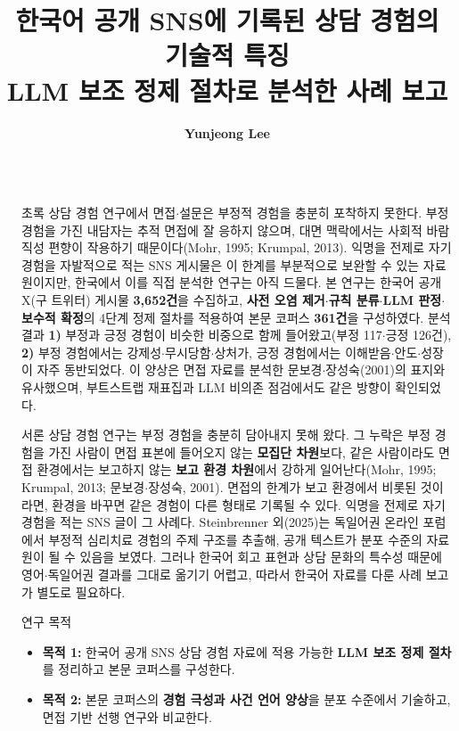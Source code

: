 \documentclass[final]{beamer}
\title{한국어 공개 SNS에 기록된 상담 경험의 기술적 특징\\
\large LLM 보조 정제 절차로 분석한 사례 보고}
\author{\textbf{Yunjeong Lee}}
\institute[shortinst]{서울대학교 (Seoul National University)}
\newlength{\sepwidth}
\newlength{\colwidth}
\newcommand{\separatorcolumn}{\begin{column}{\sepwidth}\end{column}}
\begin{document}
\begin{frame}[t]
\begin{columns}[t]
\separatorcolumn

\begin{column}{\colwidth}

  \begin{block}{초록}
    상담 경험 연구에서 면접$\cdot$설문은 부정적 경험을 충분히 포착하지 못한다. 부정 경험을 가진 내담자는 추적 면접에 잘 응하지 않으며, 대면 맥락에서는 사회적 바람직성 편향이 작용하기 때문이다(Mohr, 1995; Krumpal, 2013). 익명을 전제로 자기 경험을 자발적으로 적는 SNS 게시물은 이 한계를 부분적으로 보완할 수 있는 자료원이지만, 한국에서 이를 직접 분석한 연구는 아직 드물다. 본 연구는 한국어 공개 X(구 트위터) 게시물 \textbf{3{,}652건}을 수집하고, \textbf{사전 오염 제거$\cdot$규칙 분류$\cdot$LLM 판정$\cdot$보수적 확정}의 4단계 정제 절차를 적용하여 본문 코퍼스 \textbf{361건}을 구성하였다. 분석 결과 \textbf{1)} 부정과 긍정 경험이 비슷한 비중으로 함께 들어왔고(부정 117$\cdot$긍정 126건), \textbf{2)} 부정 경험에서는 강제성$\cdot$무시당함$\cdot$상처가, 긍정 경험에서는 이해받음$\cdot$안도$\cdot$성장이 자주 동반되었다. 이 양상은 면접 자료를 분석한 문보경$\cdot$장성숙(2001)의 표지와 유사했으며, 부트스트랩 재표집과 LLM 비의존 점검에서도 같은 방향이 확인되었다.
  \end{block}

  \begin{block}{서론}
    상담 경험 연구는 부정 경험을 충분히 담아내지 못해 왔다. 그 누락은 부정 경험을 가진 사람이 면접 표본에 들어오지 않는 \textbf{모집단 차원}보다, 같은 사람이라도 면접 환경에서는 보고하지 않는 \textbf{보고 환경 차원}에서 강하게 일어난다(Mohr, 1995; Krumpal, 2013; 문보경$\cdot$장성숙, 2001). 면접의 한계가 보고 환경에서 비롯된 것이라면, 환경을 바꾸면 같은 경험이 다른 형태로 기록될 수 있다. 익명을 전제로 자기 경험을 적는 SNS 글이 그 사례다. Steinbrenner 외(2025)는 독일어권 온라인 포럼에서 부정적 심리치료 경험의 주제 구조를 추출해, 공개 텍스트가 분포 수준의 자료원이 될 수 있음을 보였다. 그러나 한국어 회고 표현과 상담 문화의 특수성 때문에 영어$\cdot$독일어권 결과를 그대로 옮기기 어렵고, 따라서 한국어 자료를 다룬 사례 보고가 별도로 필요하다.
  \end{block}

  \begin{alertblock}{연구 목적}
    \begin{itemize}
      \item \textbf{목적 1:} 한국어 공개 SNS 상담 경험 자료에 적용 가능한 \textbf{LLM 보조 정제 절차}를 정리하고 본문 코퍼스를 구성한다.
      \item \textbf{목적 2:} 본문 코퍼스의 \textbf{경험 극성과 사건 언어 양상}을 분포 수준에서 기술하고, 면접 기반 선행 연구와 비교한다.
    \end{itemize}
  \end{alertblock}


\end{column}
\end{columns}
\end{frame}
\end{document}
